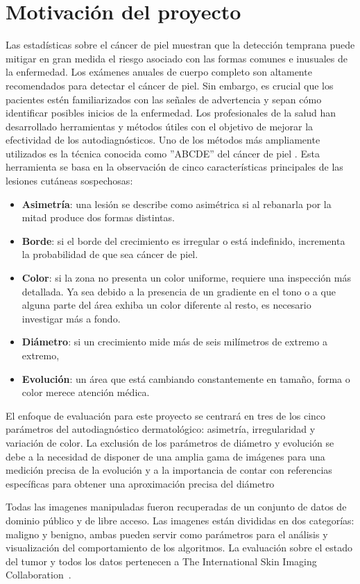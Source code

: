 \section{Motivación del proyecto}

Las estadísticas sobre el cáncer de piel muestran que la detección temprana puede mitigar en gran medida el riesgo asociado con las formas comunes e inusuales de la enfermedad.  Los exámenes anuales de cuerpo completo son altamente recomendados para detectar el cáncer de piel. Sin embargo, es crucial que los pacientes estén familiarizados con las señales de advertencia y sepan cómo identificar posibles inicios de la enfermedad. Los profesionales de la salud han desarrollado herramientas y métodos útiles con el objetivo de mejorar la efectividad de los autodiagnósticos. Uno de los métodos más ampliamente utilizados es la técnica conocida como ''ABCDE'' del cáncer de piel \autocite{jensen:2015}. Esta herramienta se basa en la observación de cinco características principales de las lesiones cutáneas sospechosas:

\begin{itemize}
    \item \textbf{Asimetría}: una lesión se describe como asimétrica si al rebanarla por la mitad produce dos formas distintas.
    \item \textbf{Borde}: si el borde del crecimiento es irregular o está indefinido, incrementa la probabilidad de que sea cáncer de piel.
    \item \textbf{Color}: si la zona no presenta un color uniforme, requiere una inspección más detallada. Ya sea debido a la presencia de un gradiente en el tono o a que alguna parte del área exhiba un color diferente al resto, es necesario investigar más a fondo.
    \item \textbf{Diámetro}: si un crecimiento mide más de seis milímetros de extremo a extremo,
    \item \textbf{Evolución}: un área que está cambiando constantemente en tamaño, forma o color merece atención médica.
\end{itemize}

El enfoque de evaluación para este proyecto se centrará en tres de los cinco parámetros del autodiagnóstico dermatológico: asimetría, irregularidad y variación de color. La exclusión de los parámetros de diámetro y evolución se debe a la necesidad de disponer de una amplia gama de imágenes para una medición precisa de la evolución y a la importancia de contar con referencias específicas para obtener una aproximación precisa del diámetro

Todas las imagenes manipuladas fueron recuperadas de un conjunto de datos de dominio público y de libre acceso. Las imagenes están divididas en dos categorías: maligno y benigno, ambas pueden servir como parámetros para el análisis y visualización del comportamiento de los algoritmos. La evaluación sobre el estado del tumor y todos los datos pertenecen a The International Skin Imaging Collaboration \autocite{ISIC:2019}. 